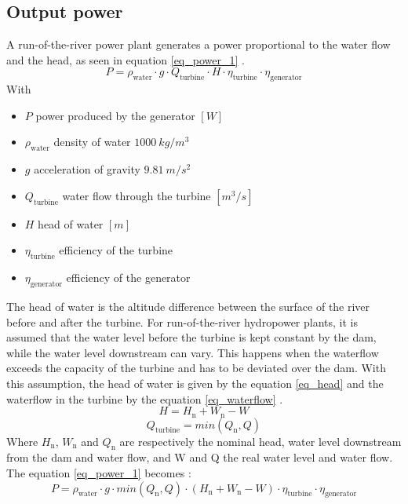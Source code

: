 \subsection{Output power}
A run-of-the-river power plant generates a power proportional to the water flow and the head, as seen in equation \ref{eq_power_1} \cite{quaschning}.
\begin{equation}
\label{eq_power_1} 
 P = \rho_\mathrm{water} \cdot g \cdot Q_\mathrm{turbine} \cdot H \cdot \eta_\mathrm{turbine} \cdot \eta_\mathrm{generator}
\end{equation}
With 
\begin{itemize}
\itemsep0em 
 \item $P$ \tabto{4cm} power produced by the generator \tabto{12cm} $[W]$
 \item $\rho_\mathrm{water}$ \tabto{4cm} density of water \tabto{12cm} $1000 \ kg/m^3$
 \item $g$ \tabto{4cm} acceleration of gravity \tabto{12cm} $9.81 \ m/s^2$
 \item $Q_\mathrm{turbine}$ \tabto{4cm} water flow through the turbine \tabto{12cm} $[m^3/s]$
 \item $H$ \tabto{4cm} head of water \tabto{12cm} $[m]$
 \item $\eta_\mathrm{turbine}$ \tabto{4cm} efficiency of the turbine
 \item $\eta_\mathrm{generator}$ \tabto{4cm} efficiency of the generator
\end{itemize}


The head of water is the altitude difference between the surface of the river before and after the turbine. For run-of-the-river hydropower plants, it is assumed that the water level before the turbine is kept constant by the dam, while the water level downstream can vary. This happens when the waterflow exceeds the capacity of the turbine and has to be deviated over the dam. With this assumption, the head of water is given by the equation \ref{eq_head} and the waterflow in the turbine by the equation \ref{eq_waterflow} \cite{quaschning}.
\begin{equation}
\label{eq_head} 
 H = H_\mathrm{n} +W_\mathrm{n}-W
\end{equation}
\begin{equation}
\label{eq_waterflow} 
 Q_\mathrm{turbine} = min(Q_\mathrm{n},Q)
\end{equation}
Where $H_\mathrm{n}$, $W_\mathrm{n}$ and $Q_\mathrm{n}$ are respectively the nominal head, water level downstream from the dam and water flow, and W and Q the real water level and water flow.
\newline
The  equation \ref{eq_power_1} becomes :
\begin{equation}
 \label{eq_power_2} 
 P = \rho_\mathrm{water} \cdot g \cdot min(Q_\mathrm{n},Q) \cdot (H_\mathrm{n} +W_\mathrm{n}-W) \cdot \eta_\mathrm{turbine} \cdot \eta_\mathrm{generator}
\end{equation}
